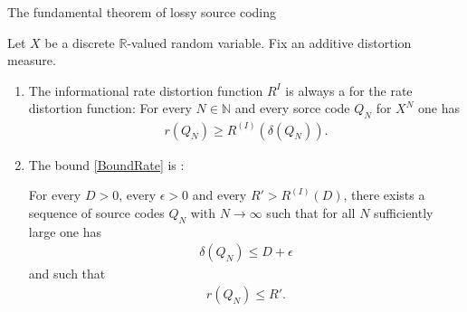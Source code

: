 \begin{frame}{The fundamental theorem of lossy source coding}
\begin{theorem}
Let $X$ be a discrete $\mathbb{R}$-valued random variable. Fix an additive distortion measure. 
\begin{enumerate}
\item The informational rate distortion function $R^{I}$ is always a  for the rate distortion function: 
For every $N\in\mathbb{N}$ and every sorce code $Q_N$ for $X^N$ one has  
\begin{align}\label{BoundRate}
r(Q_N)\geq R^{(I)}(\delta(Q_N)). 
\end{align}
\item The bound \eqref{BoundRate} is :

For every $D>0$, every $\epsilon>0$ and every $R'>R^{(I)}(D)$,  there exists a sequence 
of source codes $Q_N$ with $N\to\infty$ such that for all $N$ sufficiently large one has 
\begin{align*}
\delta(Q_N)\leq D+\epsilon
\end{align*}
and such that
\begin{align*}
r(Q_{N})\leq R'. 
\end{align*}
\end{enumerate}
\end{theorem}
\end{frame}

